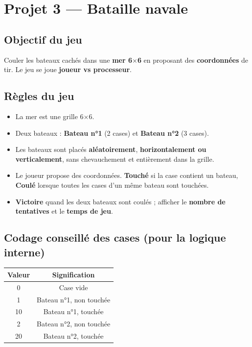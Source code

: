 \section{Projet 3 — Bataille navale}
\setcounter{UPSTInumeroCahier des charges}{0}

\subsection*{Objectif du jeu}
Couler les bateaux cachés dans une \textbf{mer 6$\times$6} en proposant des \textbf{coordonnées} de tir. Le jeu se joue \textbf{joueur vs processeur}.

\subsection*{Règles du jeu}
\begin{itemize}
  \item La mer est une grille 6$\times$6.
  \item Deux bateaux : \textbf{Bateau n°1} (2 cases) et \textbf{Bateau n°2} (3 cases).
  \item Les bateaux sont placés \textbf{aléatoirement}, \textbf{horizontalement ou verticalement}, sans chevauchement et entièrement dans la grille.
  \item Le joueur propose des coordonnées. \textbf{Touché} si la case contient un bateau, \textbf{Coulé} lorsque toutes les cases d’un même bateau sont touchées.
  \item \textbf{Victoire} quand les deux bateaux sont coulés ; afficher le \textbf{nombre de tentatives} et le \textbf{temps de jeu}.
\end{itemize}

\subsection*{Codage conseillé des cases (pour la logique interne)}
\begin{center}
\begin{tabular}{|c|c|}
\hline
\textbf{Valeur} & \textbf{Signification} \\ \hline
0 & Case vide \\ \hline
1 & Bateau n°1, non touchée \\ \hline
10 & Bateau n°1, touchée \\ \hline
2 & Bateau n°2, non touchée \\ \hline
20 & Bateau n°2, touchée \\ \hline
\end{tabular}
\end{center}

